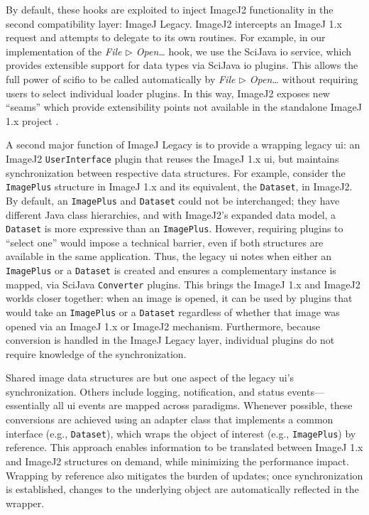 \documentclass{bmcart}
\begin{document}
By default, these hooks are exploited to inject ImageJ2 functionality in the
second compatibility layer: ImageJ Legacy. ImageJ2 intercepts an ImageJ 1.x
request and attempts to delegate to its own routines. For example, in our
implementation of the \textit{File $\triangleright$ Open\ldots} hook, we use
the SciJava \acrshort{io} service, which provides extensible support for data
types via SciJava \acrshort{io} plugins. This allows the full power of
\acrshort{scifio} to be called automatically by \textit{File $\triangleright$
Open\ldots} without requiring users to select individual loader plugins. In
this way, ImageJ2 exposes new ``seams'' which provide extensibility points not
available in the standalone ImageJ 1.x project \cite{legacy_code}.

A second major function of ImageJ Legacy is to provide a wrapping legacy
\acrshort{ui}: an ImageJ2 \texttt{UserInterface} plugin that reuses the ImageJ
1.x \acrshort{ui}, but maintains synchronization between respective data
structures. For example, consider the \texttt{ImagePlus} structure in ImageJ
1.x and its equivalent, the \texttt{Dataset}, in ImageJ2. By default, an
\texttt{ImagePlus} and \texttt{Dataset} could not be interchanged; they have
different Java class hierarchies, and with ImageJ2's expanded data model, a
\texttt{Dataset} is more expressive than an \texttt{ImagePlus}. However,
requiring plugins to ``select one'' would impose a technical barrier, even if
both structures are available in the same application. Thus, the legacy
\acrshort{ui} notes when either an \texttt{ImagePlus} or a \texttt{Dataset} is
created and ensures a complementary instance is mapped, via SciJava
\texttt{Converter} plugins. This brings the ImageJ 1.x and ImageJ2 worlds
closer together: when an image is opened, it can be used by plugins that would
take an \texttt{ImagePlus} or a \texttt{Dataset} regardless of whether that
image was opened via an ImageJ 1.x or ImageJ2 mechanism. Furthermore, because
conversion is handled in the ImageJ Legacy layer, individual plugins do not
require knowledge of the synchronization.

Shared image data structures are but one aspect of the legacy \acrshort{ui}'s
synchronization. Others include logging, notification, and status
events---essentially all \acrshort{ui} events are mapped across paradigms.
Whenever possible, these conversions are achieved using an adapter class that
implements a common interface (e.g., \texttt{Dataset}), which wraps the object
of interest (e.g., \texttt{ImagePlus}) by reference. This approach enables
information to be translated between ImageJ 1.x and ImageJ2 structures on
demand, while minimizing the performance impact. Wrapping by reference also
mitigates the burden of updates; once synchronization is established, changes
to the underlying object are automatically reflected in the wrapper.
\end{document}
